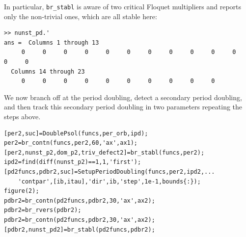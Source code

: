 \documentclass[10pt]{scrartcl}
\newcommand{\blist}[1]{\mbox{\lstinline!#1!}}
\begin{document}
In particular, \blist{br_stabl} is aware of two critical Floquet multipliers and reports only the non-trivial ones, which are all stable here:
\begin{verbatim}
>> nunst_pd.'
ans =  Columns 1 through 13
     0     0     0     0     0     0     0     0     0     0     0     0     0
  Columns 14 through 23
     0     0     0     0     0     0     0     0     0     0
\end{verbatim}
We now branch off at the period doubling, detect a secondary period doubling, and then track this secondary period doubling in two parameters repeating the steps above.
\begin{lstlisting}
[per2,suc]=DoublePsol(funcs,per_orb,ipd);
per2=br_contn(funcs,per2,60,'ax',ax1);
[per2,nunst_p2,dom_p2,triv_defect2]=br_stabl(funcs,per2); 
ipd2=find(diff(nunst_p2)==1,1,'first');
[pd2funcs,pdbr2,suc]=SetupPeriodDoubling(funcs,per2,ipd2,...
    'contpar',[ib,itau],'dir',ib,'step',1e-1,bounds{:});
figure(2);
pdbr2=br_contn(pd2funcs,pdbr2,30,'ax',ax2);
pdbr2=br_rvers(pdbr2);
pdbr2=br_contn(pd2funcs,pdbr2,30,'ax',ax2);
[pdbr2,nunst_pd2]=br_stabl(pd2funcs,pdbr2);
\end{lstlisting}
\end{document}

